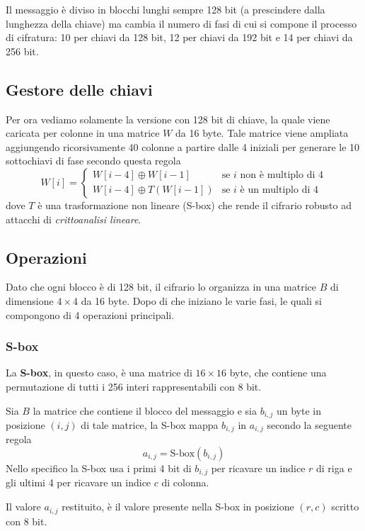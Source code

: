 Il messaggio \`e diviso in blocchi lunghi sempre 128 bit (a prescindere dalla lunghezza della chiave) ma cambia il
numero di fasi di cui si compone il processo di cifratura: 10 per chiavi da 128 bit, 12 per chiavi da 192 bit e 14
per chiavi da 256 bit.

\subsection{Gestore delle chiavi}
Per ora vediamo solamente la versione con 128 bit di chiave, la quale viene caricata per colonne in una matrice $W$ da
16 byte. Tale matrice viene ampliata aggiungendo ricorsivamente 40 colonne a partire dalle 4 iniziali per generare le 10
sottochiavi di fase secondo questa regola
\[
	W[i] = \begin{cases}
		W[i - 4] \oplus W[i - 1]    & \text{se $i$ non \`e multiplo di 4} \\
		W[i - 4] \oplus T(W[i - 1]) & \text{se $i$ \`e un multiplo di 4}
	\end{cases}
\]
dove $T$ \`e una trasformazione non lineare (S-box) che rende il cifrario robusto ad attacchi di
\emph{crittoanalisi lineare}.

\subsection{Operazioni}
Dato che ogni blocco \`e di 128 bit, il cifrario lo organizza in una matrice $B$ di dimensione $4 \times 4$ da 16 byte.
Dopo di che iniziano le varie fasi, le quali si compongono di 4 operazioni principali.

\subsubsection{S-box}
La \textbf{S-box}, in questo caso, \`e una matrice di $16 \times 16$ byte, che contiene una permutazione di tutti i 256
interi rappresentabili con 8 bit.

Sia $B$ la matrice che contiene il blocco del messaggio e sia $b_{i, j}$ un byte in posizione $(i, j)$ di tale matrice,
la S-box mappa $b_{i, j}$ in $a_{i, j}$ secondo la seguente regola
\[ a_{i, j} = \text{S-box}(b_{i, j}) \]
Nello specifico la S-box usa i primi 4 bit di $b_{i, j}$ per ricavare un indice $r$ di riga e gli ultimi 4 per ricavare
un indice $c$ di colonna.

Il valore $a_{i, j}$ restituito, \`e il valore presente nella S-box in posizione $(r, c)$ scritto con 8 bit.

